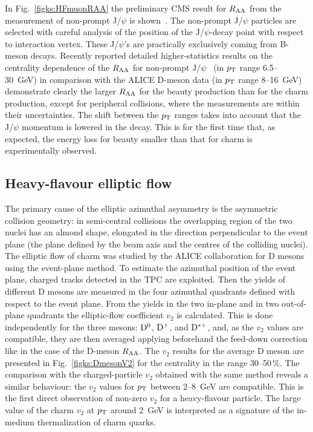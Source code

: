In Fig.~\ref{figks:HFmuonRAA} the preliminary CMS result for $R_{\rm AA}$ from the measurement of non-prompt J/$\psi$ is shown~\cite{Chatrchyan:2012np}. The non-prompt J/$\psi$ particles are selected with careful analysis of the position of the J/$\psi$-decay point with respect to interaction vertex. These J/$\psi$'s are practically exclusively coming from B-meson decays. Recently reported detailed higher-statistics results on the centrality dependence of the $R_{\rm AA}$ for non-prompt J/$\psi$~\cite{CMS:2012wba} (in $p_{\rm T}$ range 6.5--30~GeV)  in comparison with the ALICE D-meson data (in $p_{\rm T}$ range 8--16~GeV) demonstrate clearly the larger $R_{\rm AA}$ for the beauty production than for the charm production, except for peripheral collisions, where the measurements are within their uncertainties. The shift between the $p_{\rm T}$ ranges takes into account that the J/$\psi$ momentum is lowered in the decay. This is for the first time that, as expected, the energy loss for beauty smaller than that for charm is experimentally observed.
\subsection{Heavy-flavour elliptic flow}
\label{subsecks:heavyflow}
The primary cause of the elliptic azimuthal asymmetry is the asymmetric collision geometry: in semi-central collisions the overlapping region of the two nuclei has an almond shape, elongated in the direction perpendicular to the event plane (the plane defined by the beam axis and the centres of the colliding nuclei). The elliptic flow of charm was studied by the ALICE collaboration for D mesons using the event-plane method. To estimate the azimuthal position of the event plane, charged tracks detected in the TPC are exploited. Then the yields of different D mesons are measured in the four azimuthal quadrants defined with respect to the event plane. From the yields in the two in-plane and in two out-of-plane quadrants the elliptic-flow coefficient $v_2$ is calculated. This is done independently for the three mesons: ${\rm D}^0$, ${\rm D}^+$, and ${\rm D}^{*+}$, and, as the $v_2$ values are compatible, they are then averaged applying beforehand the feed-down correction like in the case of the D-meson $R_{\rm AA}$. The $v_2$ results for the average D meson are presented in Fig.~\ref{figks:DmesonV2} for the centrality in the range 30--50\,\%. The comparison with the charged-particle $v_2$ obtained with the same method reveals a similar behaviour: the $v_2$ values for $p_{\rm T}$ between 2--8~GeV are compatible. This is the first direct observation of non-zero $v_2$ for a heavy-flavour particle. The large value of the charm $v_2$ at $p_{\rm T}$ around 2~GeV is interpreted as a signature of the in-medium thermalization of charm quarks.

